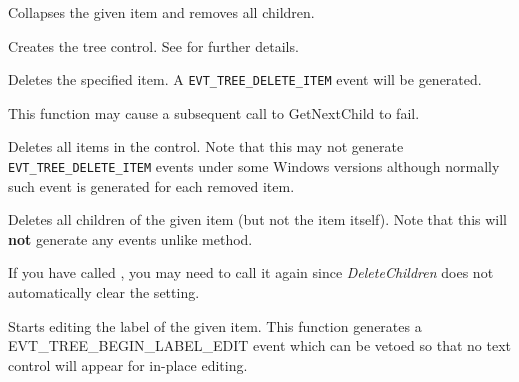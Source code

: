 
Collapses the given item and removes all children.


\label{wxtreectrlcreate}


Creates the tree control. See  for further details.


\label{wxtreectrldelete}


Deletes the specified item. A {\tt EVT\_TREE\_DELETE\_ITEM} event will be
generated.

This function may cause a subsequent call to GetNextChild to fail.


\label{wxtreectrldeleteallitems}


Deletes all items in the control. Note that this may not generate
{\tt EVT\_TREE\_DELETE\_ITEM} events under some Windows versions although
normally such event is generated for each removed item.


\label{wxtreectrldeletechildren}


Deletes all children of the given item (but not the item itself). Note that
this will {\bf not} generate any events unlike
 method.

If you have called , you
may need to call it again since {\it DeleteChildren} does not automatically
clear the setting.


\label{wxtreectrleditlabel}


Starts editing the label of the given item. This function generates a
EVT\_TREE\_BEGIN\_LABEL\_EDIT event which can be vetoed so that no
text control will appear for in-place editing.


